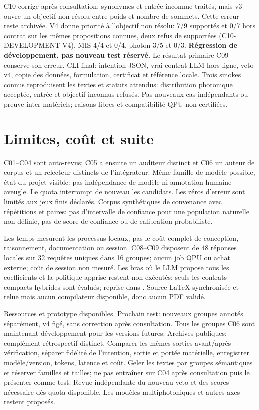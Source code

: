 \documentclass{article}
\begin{document}
C10 corrige après consultation: synonymes et entrée inconnue traités,
mais v3 ouvre un objectif non résolu entre poids et nombre de sommets.
Cette erreur reste archivée. V4 donne priorité à l'objectif non résolu:
7/9 supportés et 0/7 hors contrat sur les mêmes propositions connues,
deux refus de supportées (C10-DEVELOPMENT-V4). MIS 4/4 et 0/4,
photon 3/5 et 0/3. \textbf{Régression de développement, pas nouveau test réservé.}
Le résultat primaire C09 conserve son erreur.
CLI final: intention JSON, vrai contrat LLM hors ligne, veto v4, copie des
données, formulation, certificat et référence locale. Trois smokes connus
reproduisent les textes et statuts attendus: distribution photonique acceptée,
entrée et objectif inconnus refusés. Pas nouveaux cas indépendants ou preuve
inter-matériels; raisons libres et compatibilité QPU non certifiées.

\section{Limites, coût et suite}
C01--C04 sont auto-revus; C05 a ensuite un auditeur distinct et C06 un
auteur de corpus et un relecteur distincts de l’intégrateur. Même famille
de modèle possible, état du projet visible: pas indépendance de modèle
ni annotation humaine aveugle. Le quota interrompt de nouveau les candidats.
Les zéros d'erreur sont limités aux jeux finis déclarés.
Corpus synthétiques de convenance avec répétitions et paires:
pas d'intervalle de confiance pour une population naturelle non définie,
pas de score de confiance ou de calibration probabiliste.

Les temps mesurent les processus locaux, pas le coût complet de conception,
raisonnement, documentation ou session.
C08--C09 disposent de 48 réponses locales sur 32 requêtes uniques dans 16 groupes; aucun job QPU ou achat externe; coût de session
non mesuré. Les bras où le LLM propose tous les coefficients et la politique apprise
restent non exécutés; seuls les contrats compacts hybrides sont évalués; reprise dans .
Source LaTeX synchronisée et relue mais aucun compilateur disponible,
donc aucun PDF validé.

Ressources et prototype disponibles. Prochain test: nouveaux groupes annotés
séparément, v4 figé, sans correction après consultation. Tous les groupes C06
sont maintenant développement pour les versions futures. Archives publiques:
complément rétrospectif distinct. Comparer les mêmes sorties
avant/après vérification, séparer fidélité de l'intention, sortie et portée
matérielle, enregistrer modèle/version, tokens, latence et coût.
Geler les textes par groupes sémantiques et réserver familles et tailles;
ne pas entraîner sur C04 après consultation puis le présenter comme test.
Revue indépendante du nouveau veto et des scores nécessaire dès quota disponible.
Les modèles multiphotoniques et autres axes restent proposés.
\end{document}
